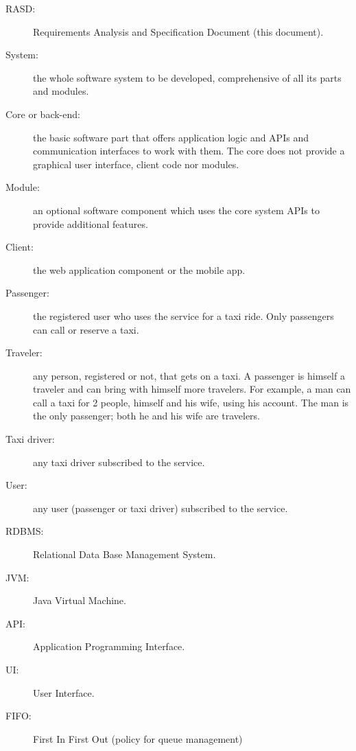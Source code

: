 \begin{description}
\item[RASD:] Requirements Analysis and Specification Document (this document).
\item[System:] the whole software system to be developed, comprehensive of all its parts and modules.
\item[Core or back-end:] the basic software part that offers application logic and APIs and communication interfaces to work with them. The core does not provide a graphical user interface, client code nor modules.
\item[Module:] an optional software component which uses the core system APIs to provide additional features.
\item[Client:] the web application component or the mobile app.
\item[Passenger:] the registered user who uses the service for a taxi ride. Only passengers can call or reserve a taxi.
\item[Traveler:] any person, registered or not, that gets on a taxi. A passenger is himself a traveler and can bring with himself more travelers.
For example, a man can call a taxi for 2 people, himself and his wife, using his account. The man is the only passenger; both he and his wife are travelers.
\item[Taxi driver:] any taxi driver subscribed to the service.
\item[User:] any user (passenger or taxi driver) subscribed to the service.
\item[RDBMS:] Relational Data Base Management System.
\item[JVM:] Java Virtual Machine.
\item[API:] Application Programming Interface.
\item[UI:] User Interface.
\item[FIFO:] First In First Out (policy for queue management)
\end{description}
